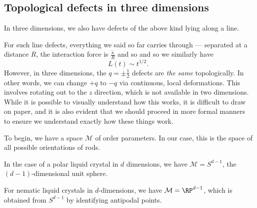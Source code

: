 \documentclass[a4paper]{article}
\begin{document}
\subsection{Topological defects in three dimensions}
In three dimensions, we also have defects of the above kind lying along a line.
\begin{center}
\end{center}
For such line defects, everything we said so far carries through --- separated at a distance $R$, the interaction force is $\frac{\tilde{\kappa}}{R}$ and so
and so we similarly have
\[
  L(t) \sim t^{1/2}.
\]
However, in three dimensions, the $q = \pm \frac{1}{2}$ defects are \emph{the same} topologically. In other words, we can change $+q$ to $-q$ via continuous, local deformations. This involves rotating out to the $z$ direction, which is not available in two dimensions. While it is possible to visually understand how this works, it is difficult to draw on paper, and it is also evident that we should proceed in more formal manners to ensure we understand exactly how these things work.

To begin, we have a space $\mathcal{M}$ of order parameters. In our case, this is the space of all possible orientations of rods. 
\begin{eg}
  In the case of a polar liquid crystal in $d$ dimensions, we have $\mathcal{M} = S^{d - 1}$, the $(d - 1)$-dimensional unit sphere.
\end{eg}

\begin{eg}
  For nematic liquid crystals in $d$-dimensions, we have $\mathcal{M} = \RP^{d - 1}$, which is obtained from $S^{d - 1}$ by identifying antipodal points.
\end{eg}
\end{document}
